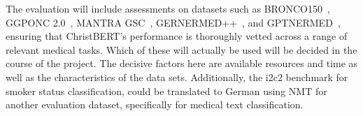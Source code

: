 The evaluation will include assessments on datasets such as
BRONCO150~\cite{kittner2021bronco150}, GGPONC 2.0~\cite{borchert2022ggponc},
MANTRA GSC~\cite{kors2015mantragsc}, GERNERMED++~\cite{frei2022gernermed}, and
GPTNERMED~\cite{frei2023gptnermed}, ensuring that ChristBERT's performance is
thoroughly vetted across a range of relevant medical tasks. Which of these will
actually be used will be decided in the course of the project. The decisive
factors here are available resources and time as well as the characteristics of
the data sets. Additionally, the i2c2 benchmark for smoker status
classification, could be translated to German using NMT for another evaluation
dataset, specifically for medical text classification.

